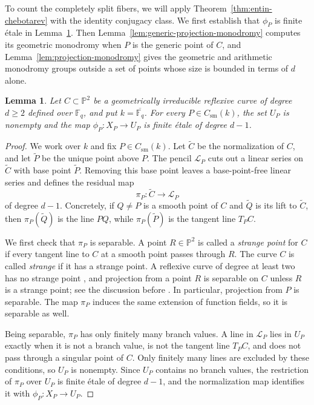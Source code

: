 \documentclass[10pt,a4paper]{amsart}
\newtheorem{lemma}[theorem]{Lemma}
\theoremstyle{definition}
\theoremstyle{remark}
\newcommand{\Fq}{\mathbb{F}_q}
\newcommand{\bP}{\mathbb{P}}
\begin{document}
To count the completely split fibers, we will apply Theorem~\ref{thm:entin-chebotarev} with the identity conjugacy class. We first establish that $\phi_P$ is finite \'etale in Lemma~\ref{lem:incidence-cover}. Then Lemma~\ref{lem:generic-projection-monodromy} computes its geometric monodromy when $P$ is the generic point of $C$, and Lemma~\ref{lem:projection-monodromy} gives the geometric and arithmetic monodromy groups outside a set of points whose size is bounded in terms of $d$ alone.


\begin{lemma}\label{lem:incidence-cover}
Let $C\subset\bP^2$ be a geometrically irreducible reflexive curve of degree $d\geq2$ defined over $\Fq$, and put $k=\overline{\Fq}$. For every $P\in C_{\mathrm{sm}}(k)$, the set $U_P$ is nonempty and the map $\phi_P\colon X_P\to U_P$ is finite \'etale of degree $d-1$.
\end{lemma}

\begin{proof}
We work over $k$ and fix $P\in C_{\mathrm{sm}}(k)$. Let $\widetilde C$ be the normalization of $C$, and let $\widetilde P$ be the unique point above $P$. The pencil $\mathcal L_P$ cuts out a linear series on $\widetilde C$ with base point $\widetilde P$. Removing this base point leaves a base-point-free linear series and defines the residual map
\[
\pi_P\colon\widetilde C\longrightarrow\mathcal L_P
\]
of degree $d-1$. Concretely, if $Q\neq P$ is a smooth point of $C$ and $\widetilde Q$ is its lift to $\widetilde C$, then $\pi_P(\widetilde Q)$ is the line $PQ$, while $\pi_P(\widetilde P)$ is the tangent line $T_PC$.

We first check that $\pi_P$ is separable. A point $R\in\bP^2$ is called a \emph{strange point} for $C$ if every tangent line to $C$ at a smooth point passes through $R$. The curve $C$ is called \emph{strange} if it has a strange point. A reflexive curve of degree at least two has no strange point \cite[p.~4]{Hef89}, and projection from a point $R$ is separable on $C$ unless $R$ is a strange point; see the discussion before \cite[Lemma~2.2]{Ent21}. In particular, projection from $P$ is separable. The map $\pi_P$ induces the same extension of function fields, so it is separable as well.

Being separable, $\pi_P$ has only finitely many branch values. A line in $\mathcal L_P$ lies in $U_P$ exactly when it is not a branch value, is not the tangent line $T_PC$, and does not pass through a singular point of $C$. Only finitely many lines are excluded by these conditions, so $U_P$ is nonempty. Since $U_P$ contains no branch values, the restriction of $\pi_P$ over $U_P$ is finite \'etale of degree $d-1$, and the normalization map identifies it with $\phi_P\colon X_P\to U_P$.
\end{proof}
\end{document}

